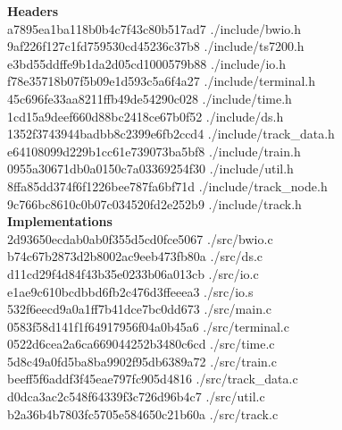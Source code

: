 \documentclass[11pt]{article}
\begin{document}
\noindent
\textbf{Headers}\\
a7895ea1ba118b0b4c7f43c80b517ad7  ./include/bwio.h\\
9af226f127c1fd759530cd45236c37b8  ./include/ts7200.h\\
e3bd55ddffe9b1da2d05cd1000579b88  ./include/io.h\\
f78e35718b07f5b09e1d593c5a6f4a27  ./include/terminal.h\\
45c696fe33aa8211ffb49de54290c028  ./include/time.h\\
1cd15a9deef660d88bc2418ce67b0f52  ./include/ds.h\\
1352f3743944badbb8c2399e6fb2ccd4  ./include/track\_data.h\\
e64108099d229b1cc61e739073ba5bf8  ./include/train.h\\
0955a30671db0a0150c7a03369254f30  ./include/util.h\\
8ffa85dd374f6f1226bee787fa6bf71d  ./include/track\_node.h\\
9c766bc8610c0b07c034520fd2e252b9  ./include/track.h\\

\noindent
\textbf{Implementations}\\
2d93650ecdab0ab0f355d5cd0fce5067  ./src/bwio.c\\
b74c67b2873d2b8002ac9eeb473fb80a  ./src/ds.c\\
d11cd29f4d84f43b35e0233b06a013cb  ./src/io.c\\
e1ae9c610bcdbbd6fb2c476d3ffeeea3  ./src/io.s\\
532f6eecd9a0a1ff7b41dce7bc0dd673  ./src/main.c\\
0583f58d141f1f64917956f04a0b45a6  ./src/terminal.c\\
0522d6cea2a6ca669044252b3480c6cd  ./src/time.c\\
5d8c49a0fd5ba8ba9902f95db6389a72  ./src/train.c\\
beeff5f6addf3f45eae797fc905d4816  ./src/track\_data.c\\
d0dca3ac2c548f64339f3c726d96b4c7  ./src/util.c\\
b2a36b4b7803fc5705e584650c21b60a  ./src/track.c\\
\end{document}
